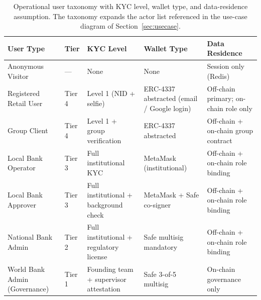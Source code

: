 \documentclass[12pt,a4paper]{report}
\begin{document}
\begin{table}[H]
\centering
\caption{Operational user taxonomy with KYC level, wallet type, and data-residence assumption. The taxonomy expands the actor list referenced in the use-case diagram of Section~\ref{sec:usecase}.}
\label{tab:user-taxonomy}
\small
\begin{tabular}{p{3.1cm}p{1.4cm}p{2.6cm}p{2.4cm}p{3.4cm}}
\hline
\textbf{User Type} & \textbf{Tier} & \textbf{KYC Level} & \textbf{Wallet Type} & \textbf{Data Residence} \\
\hline
Anonymous Visitor & --- & None & None & Session only (Redis) \\
\hline
Registered Retail User & Tier 4 & Level 1 (NID + selfie) & ERC-4337 abstracted (email / Google login) & Off-chain primary; on-chain role only \\
\hline
Group Client & Tier 4 & Level 1 + group verification & ERC-4337 abstracted & Off-chain + on-chain group contract \\
\hline
Local Bank Operator & Tier 3 & Full institutional KYC & MetaMask (institutional) & Off-chain + on-chain role binding \\
\hline
Local Bank Approver & Tier 3 & Full institutional + background check & MetaMask + Safe co-signer & Off-chain + on-chain role binding \\
\hline
National Bank Admin & Tier 2 & Full institutional + regulatory license & Safe multisig mandatory & Off-chain + on-chain role binding \\
\hline
World Bank Admin (Governance) & Tier 1 & Founding team + supervisor attestation & Safe 3-of-5 multisig & On-chain governance only \\
\hline
\end{tabular}
\end{table}
\end{document}
